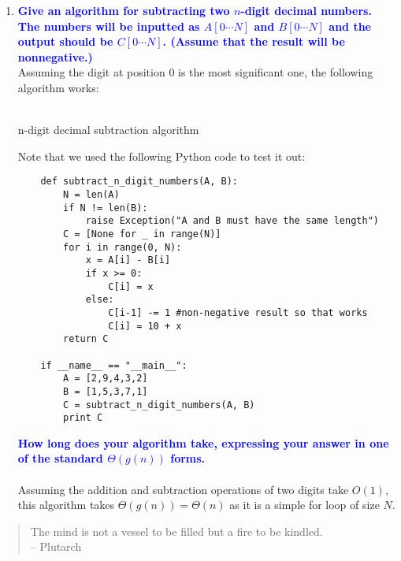 \documentclass[11pt]{article}
\begin{document}
\begin{enumerate}
\item \textbf{\textcolor{blue}{Give an algorithm for subtracting two $n$-digit decimal numbers.
The numbers will be inputted as $A[0\cdots N]$ and $B[0\cdots N]$
and the output should be $C[0\cdots N]$.  (Assume that the result will
be nonnegative.)}}
    \\ Assuming the digit at position $0$ is the most significant one, the following algorithm works:
    \\\\
    \begin{algorithm}[H]
        \For{$i$ from $0$ to $N$}{
            X = A[i] - B[i]\
            \eIf{X >= 0}{
                C[i] = X\
            }{
                C[i-1]--\
                C[i] = 10 + X\
            }
        }
        \caption{n-digit decimal subtraction algorithm}
    \end{algorithm}
    Note that we used the following Python code to test it out:
    \begin{verbatim}
    def subtract_n_digit_numbers(A, B):
        N = len(A)
        if N != len(B):
            raise Exception("A and B must have the same length")
        C = [None for _ in range(N)]
        for i in range(0, N):
            x = A[i] - B[i]
            if x >= 0:
                C[i] = x
            else:
                C[i-1] -= 1 #non-negative result so that works
                C[i] = 10 + x
        return C    
    
    if __name__ == "__main__":
        A = [2,9,4,3,2]
        B = [1,5,3,7,1]
        C = subtract_n_digit_numbers(A, B)
        print C
    \end{verbatim}
    \newline

    \textbf{\textcolor{blue}{How long does your algorithm take, expressing
    your answer in one of the standard $\Theta(g(n))$ forms.}}
        \\\\Assuming the addition and subtraction operations of two digits take $O(1)$, this algorithm takes $\Theta(g(n))=\Theta(n)$ as it is a simple for loop of size $N$.
\end{enumerate}


\begin{quote}
The mind is not a vessel to be filled but a fire to be kindled.  \\ -- Plutarch
\end{quote}
\end{document}
